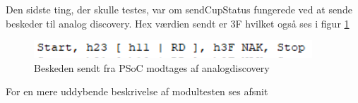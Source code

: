 \documentclass[Rapport/Playerside/RPI_IF/RPI_IF.tex]{subfiles}
\begin{document}
Den sidste ting, der skulle testes, var om sendCupStatus fungerede ved at sende beskeder til analog discovery.  Hex værdien sendt er 3F hvilket også ses i figur \ref{fig:sendCupStatus}
\begin{figure}
    \centering 
    \includegraphics[width=0.5\linewidth]{Rapport/Playerside/graphics/RPI_IF/analog_read.PNG}
    \caption{Beskeden sendt fra PSoC modtages af analogdiscovery}
    \label{fig:sendCupStatus}
\end{figure}
For en mere uddybende beskrivelse af modultesten ses afsnit 
\end{document}
